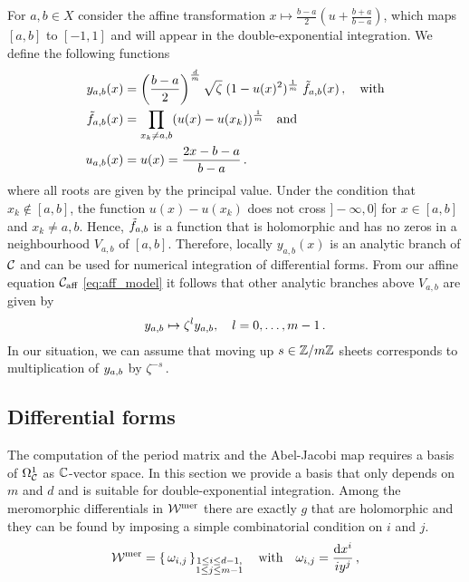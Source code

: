 \documentclass[main.tex]{subfiles}
\begin{document}
  
  For $a,b \in X$ consider the affine transformation $x \mapsto \frac{b-a}{2}\left(u+\frac{b+a}{b-a}\right)$, which maps $[a,b]$ to $[-1,1]$ and will appear in the double-exponential integration. \abstand
  We define the following functions
  \begin{align}\label{def: yab}
  \begin{split}
   y_{a,b}(x) & = \left(\frac{b-a}{2}\right)^{\frac{d}{m}} \sqrt{\zeta} \; (1 - u(x)^2)^{\frac{1}{m}} \; \tilde{f}_{a,b}(x)\,, \quad \text{with} \\
   \tilde{f}_{a,b}(x) & = \prod_{x_k \ne a,b} (u(x) - u(x_k))^{\frac{1}{m}} \quad \text{and} \\
   u_{a,b}(x) & = u(x) = \frac{2x-b-a}{b-a}\,.
   \end{split}
  \end{align}
  where all roots are given by the principal value. Under the condition that $x_k \not\in [a,b]$, the function $u(x)-u(x_k)$ does not cross $]\!\!-\infty,0]$
  for $x \in [a,b]$ and $x_k \ne a,b$. Hence,
  $\tilde{f}_{a,b}$ is a function that is holomorphic and has no zeros in a neighbourhood $V_{a,b}$ of $[a,b]$. \abstand Therefore, locally
 $y_{a,b}(x)$ is an analytic branch of $\mathcal{C}$ and can be used for numerical integration of differential forms.
  From our affine equation $\mathcal{C}_{\text{aff}}$ \eqref{eq:aff_model} it follows that other analytic branches above $V_{a,b}$ are given by
  \vspace{-0.2cm}
  \begin{align}
      y_{a,b} \mapsto \zeta^l y_{a,b}, \quad l = 0,\dots,m-1\,.
  \end{align}
  In our situation, we can assume that moving up $s \in \mathbb{Z}/m\mathbb{Z}$ sheets corresponds to multiplication of $y_{a,b}$ by $\zeta^{-s}$\,. 

  
  \subsection{Differential forms}
  
    The computation of the period matrix and the Abel-Jacobi map requires a basis of $\Omega^1_{\mathcal{C}}$ as $\mathbb{C}$-vector space. In this section we provide a basis that only 
   depends on $m$ and $d$ and is suitable for double-exponential integration. \abstand
  Among the meromorphic differentials in $\mathcal{W}^{\text{mer}}$  there are exactly $g$ that are holomorphic  and they can be found by imposing a simple combinatorial condition on $i$ and $j$.
  \begin{align*}
 \mathcal{W}^{\text{mer}} = \left\{ \, \omega_{i,j}  \, \right\}_{\substack{1 \le i \le d-1, \\ 1 \le j \le m-1}} \quad \text{with} \quad \omega_{i,j} = \frac{ \mathrm d x^i}{i y^j}\,,
  \end{align*}
\end{document}
